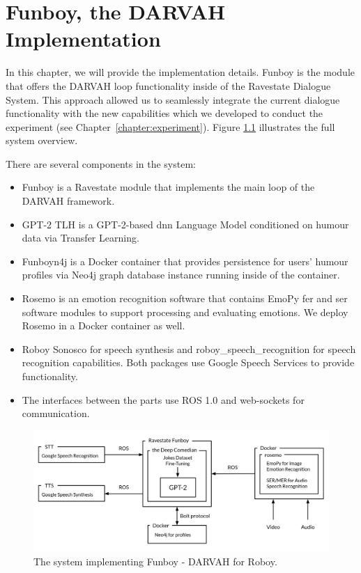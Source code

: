 
\chapter{Funboy, the DARVAH Implementation}\label{chapter:implementation}

In this chapter, we will provide the implementation details. Funboy is the module that offers the DARVAH loop functionality inside of the Ravestate Dialogue System. This approach allowed us to seamlessly integrate the current dialogue functionality with the new capabilities which we developed to conduct the experiment (see Chapter~\ref{chapter:experiment}). Figure \ref{fig:system} illustrates the full system overview.

There are several components in the system:
\begin{itemize}
    \item Funboy is a Ravestate module that implements the main loop of the DARVAH framework. 
    \item GPT-2 TLH is a GPT-2-based \acrshort{dnn} Language Model conditioned on humour data via Transfer Learning.
    \item Funboyn4j is a Docker container that provides persistence for users' humour profiles via Neo4j graph database instance running inside of the container.
    \item Rosemo is an emotion recognition software that contains EmoPy \acrlong{fer} and \acrfull{ser} software modules to support processing and evaluating emotions. We deploy Rosemo in a Docker container as well.
    \item Roboy Sonosco for speech synthesis and roboy\_speech\_recognition for speech recognition capabilities. Both packages use Google Speech Services to provide functionality.
    \item The interfaces between the parts use ROS 1.0 and web-sockets for communication.
\end{itemize}

\begin{figure}[htpb]
  \centering
  \includegraphics[width=1.0\textwidth]{figures/system.png}
  \caption{The system implementing Funboy - DARVAH for Roboy.} \label{fig:system}
\end{figure}

